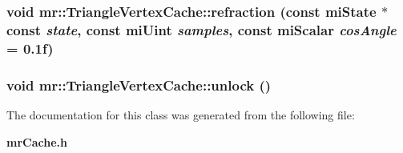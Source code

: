 \subsubsection{\setlength{\rightskip}{0pt plus 5cm}void mr::Triangle\-Vertex\-Cache::refraction (const mi\-State $\ast$const {\em state}, const mi\-Uint {\em samples}, const mi\-Scalar {\em cos\-Angle} = 0.1f)\hspace{0.3cm}{\tt  [inline]}}\label{classmr_1_1TriangleVertexCache_a5}


\subsubsection{\setlength{\rightskip}{0pt plus 5cm}void mr::Triangle\-Vertex\-Cache::unlock ()\hspace{0.3cm}{\tt  [inline]}}\label{classmr_1_1TriangleVertexCache_a3}




The documentation for this class was generated from the following file:\begin{CompactItemize}
\item 
{\bf mr\-Cache.h}\end{CompactItemize}
